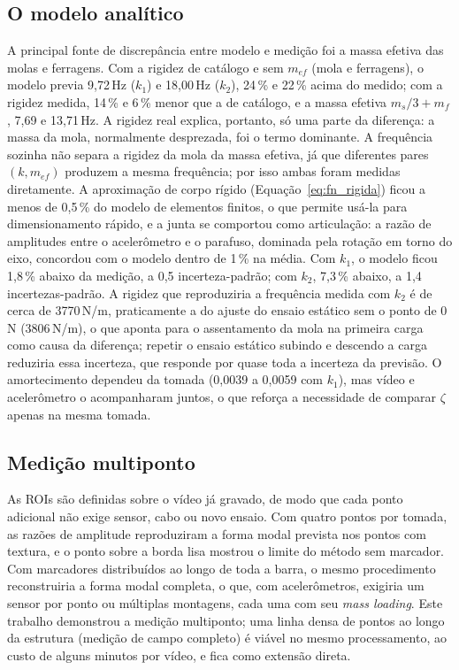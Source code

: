 \documentclass[a4paper,10pt,twocolumn]{article}
\begin{document}
\subsection{O modelo analítico}
\label{sec:disc_modelo}

A principal fonte de discrepância entre modelo e medição foi a massa efetiva das molas e ferragens. Com a rigidez de catálogo e sem $m_{ef}$ (mola e ferragens), o modelo previa 9,72\,Hz ($k_1$) e 18,00\,Hz ($k_2$), 24\,\% e 22\,\% acima do medido; com a rigidez medida, 14\,\% e 6\,\% menor que a de catálogo, e a massa efetiva $m_s/3 + m_f$, 7,69 e 13,71\,Hz. A rigidez real explica, portanto, só uma parte da diferença: a massa da mola, normalmente desprezada, foi o termo dominante. A frequência sozinha não separa a rigidez da mola da massa efetiva, já que diferentes pares $(k, m_{ef})$ produzem a mesma frequência; por isso ambas foram medidas diretamente. A aproximação de corpo rígido (Equação~\ref{eq:fn_rigida}) ficou a menos de 0,5\,\% do modelo de elementos finitos, o que permite usá-la para dimensionamento rápido, e a junta se comportou como articulação: a razão de amplitudes entre o acelerômetro e o parafuso, dominada pela rotação em torno do eixo, concordou com o modelo dentro de 1\,\% na média. Com $k_1$, o modelo ficou 1,8\,\% abaixo da medição, a 0,5 incerteza-padrão; com $k_2$, 7,3\,\% abaixo, a 1,4 incertezas-padrão. A rigidez que reproduziria a frequência medida com $k_2$ é de cerca de 3770\,N/m, praticamente a do ajuste do ensaio estático sem o ponto de 0\,N (3806\,N/m), o que aponta para o assentamento da mola na primeira carga como causa da diferença; repetir o ensaio estático subindo e descendo a carga reduziria essa incerteza, que responde por quase toda a incerteza da previsão. O amortecimento dependeu da tomada (0,0039 a 0,0059 com $k_1$), mas vídeo e acelerômetro o acompanharam juntos, o que reforça a necessidade de comparar $\zeta$ apenas na mesma tomada.

\subsection{Medição multiponto}

As ROIs são definidas sobre o vídeo já gravado, de modo que cada ponto adicional não exige sensor, cabo ou novo ensaio. Com quatro pontos por tomada, as razões de amplitude reproduziram a forma modal prevista nos pontos com textura, e o ponto sobre a borda lisa mostrou o limite do método sem marcador. Com marcadores distribuídos ao longo de toda a barra, o mesmo procedimento reconstruiria a forma modal completa, o que, com acelerômetros, exigiria um sensor por ponto ou múltiplas montagens, cada uma com seu \textit{mass loading}. Este trabalho demonstrou a medição multiponto; uma linha densa de pontos ao longo da estrutura (medição de campo completo) é viável no mesmo processamento, ao custo de alguns minutos por vídeo, e fica como extensão direta.
\end{document}
